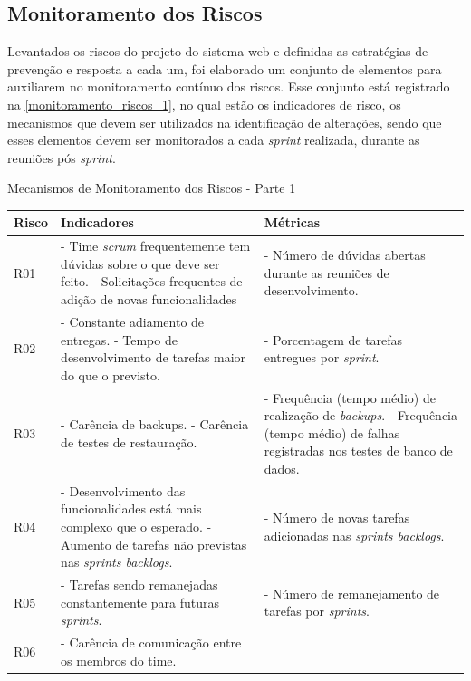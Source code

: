 \documentclass[
	12pt,				%
	openany,			%
	twoside,			%
	a4paper,			%
	english,			%
	french,				%
	spanish,			%
	brazil				%
	]{abntex2}
\begin{document}
\subsection{Monitoramento dos Riscos}
Levantados os riscos do projeto do sistema web e definidas as estratégias de prevenção e resposta a cada um, foi elaborado um conjunto de elementos para auxiliarem no monitoramento contínuo dos riscos. Esse conjunto está registrado na \autoref{monitoramento_riscos_1}, no qual estão os indicadores de risco, os mecanismos que devem ser utilizados na identificação de alterações, sendo que  esses elementos devem ser monitorados a cada \textit{sprint} realizada, durante as reuniões pós \textit{sprint}.
%
 \begin{quadro}[H]
	\caption{Mecanismos de Monitoramento dos Riscos - Parte 1}
	 \label{monitoramento_riscos_1} 
	  \begin{tabular} {|p{3cm}|p{6cm}|p{6cm}|}
		\hline
		\textbf{Risco} & \textbf{Indicadores} & \textbf{Métricas} \\
		\hline
		R01 & - Time \textit{scrum} frequentemente tem dúvidas sobre o que deve ser feito. \newline
		- Solicitações frequentes de adição de novas funcionalidades
		& - Número de dúvidas abertas durante as reuniões de desenvolvimento.
		\\	\hline
		R02 & - Constante adiamento de entregas. \newline
		- Tempo de desenvolvimento de tarefas maior do que o previsto.
		& - Porcentagem de tarefas entregues por \textit{sprint}.
		\\	\hline
		R03 & - Carência de backups. \newline
		- Carência de testes de restauração.
		& - Frequência (tempo médio) de realização de \textit{backups}. \newline
		  - Frequência (tempo médio) de falhas registradas nos testes de banco de dados.
		\\	\hline
		R04 & 	- Desenvolvimento das funcionalidades está mais complexo que o esperado. \newline
		- Aumento de tarefas não previstas nas \textit{sprints backlogs}.
		& - Número de novas tarefas adicionadas nas \textit{sprints backlogs}. 
		\\	\hline
		R05 & - Tarefas sendo remanejadas constantemente para futuras \textit{sprints}. & - Número de remanejamento de tarefas por \textit{sprints}. 
		\\ \hline
		R06 & - Carência de comunicação entre os membros do time. \newline

\end{tabular}
\end{quadro}
\end{document}
